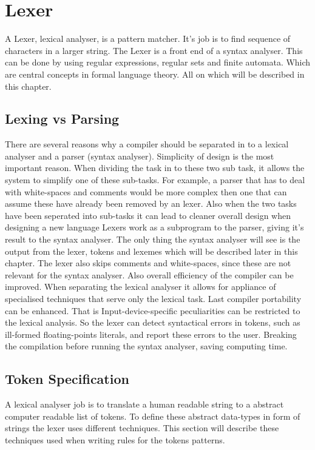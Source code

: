 \chapter{Lexer}
A Lexer, lexical analyser, is a pattern matcher. It's job is to find sequence 
of characters in a larger string. The Lexer is a front end of a syntax 
analyser. \cite{sebesta2012}
This can be done by using regular expressions, regular sets and finite
automata. Which are central concepts in formal language theory. \cite{Aho1990}
All on which will be described in this chapter.

\section{Lexing vs Parsing}
There are several reasons why a compiler should be separated in to a lexical 
analyser and a parser (syntax analyser). Simplicity of design is the most
important reason. When dividing the task in to these two sub task, it allows the
system to simplify one of these sub-tasks. For example, a parser that has to 
deal with white-spaces and comments would be more complex 
then one that can assume these have already been removed by 
an lexer. Also when the two tasks have been seperated into sub-tasks it can lead to 
cleaner overall design when designing a new language \cite{Aho2006}
Lexers work as a subprogram to the parser, giving it's result to the syntax 
analyser. The only thing the syntax analyser will see is the output from the 
lexer, tokens and lexemes which will be described later in this chapter. 
\cite{sebesta2012}
The lexer also skips comments and white-spaces, since these are not relevant 
for the syntax analyser. \cite{sebesta2012}
Also overall efficiency of the compiler can be improved. When separating the 
lexical analyser it allows for appliance of specialised techniques that serve 
only the lexical task. \cite{Aho2006}
Last compiler portability can be enhanced. That is Input-device-specific 
peculiarities can be restricted to the lexical analysis. \cite{Aho2006}
So the lexer can detect syntactical errors in tokens, such as ill-formed 
floating-points literals, and report these errors to the user. 
\cite{sebesta2012} Breaking the compilation before running the syntax analyser, 
saving computing time. 
\section{Token Specification}
A lexical analyser job is to translate a human readable string to a abstract 
computer readable list of tokens. To define these abstract data-types in form of
strings the lexer uses different techniques. This section will describe these
techniques used when writing rules for the tokens patterns. 
